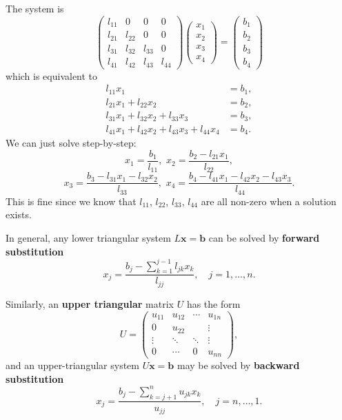 \documentclass[
  letterpaper,
  DIV=11,
  numbers=noendperiod]{scrreprt}
\newenvironment{fbxSimple}[3]{\begin{tcolorbox}[enhanced, breakable,%
attach boxed title to top*={xshift=1.4pt},
boxed title style={boxrule=0.0mm, fuzzy shadow={1pt}{-1pt}{0mm}{0.1mm}{gray}, arc=.3em, rounded corners=east, sharp corners=west}, colframe=#1-color2, colbacktitle=#1-color1, colback = white, coltitle=black,  titlerule=0mm, toprule=0pt, bottomrule=.7pt, leftrule=.3em, rightrule=.7pt, outer arc=.3em,  	left=.5em, right=.5em, bottomtitle=1mm, toptitle=1mm,title=\textbf{#2}\hspace{0.5em}{#3}]}
{\end{tcolorbox}}
\begin{document}
\label{solve-lmathbfx-mathbfb-for-n4.}
\begin{fbxSimple}{eg}{Example 3.1: }{Solve \(L\mathbf{x} = \mathbf{b}\) for \(n=4\).}
\label{solve-lmathbfx-mathbfb-for-n4.}
The system is \[
\begin{pmatrix}
l_{11} & 0 & 0 & 0\\
l_{21} & l_{22} & 0 & 0\\
l_{31} & l_{32} & l_{33} & 0\\
l_{41} & l_{42} & l_{43} & l_{44}
\end{pmatrix}
\begin{pmatrix}
x_1\\ x_2\\ x_3\\ x_4
\end{pmatrix}
=
\begin{pmatrix}
b_1\\ b_2\\ b_3\\ b_4
\end{pmatrix}
\] which is equivalent to \[
\begin{aligned}
l_{11}x_1 &= b_1,\\
l_{21}x_1 + l_{22}x_2 &= b_2,\\
l_{31}x_1 + l_{32}x_2 + l_{33}x_3 &= b_3,\\
l_{41}x_1 + l_{42}x_2 + l_{43}x_3 + l_{44}x_4 &= b_4.
\end{aligned}
\] We can just solve step-by-step: \[
x_1 = \frac{b_1}{l_{11}}, \,\, x_2 = \frac{b_2 - l_{21}x_1}{l_{22}},
\]
\[x_3 = \frac{b_3 - l_{31}x_1 - l_{32}x_2}{l_{33}}, \,\, x_4 = \frac{b_4 - l_{41}x_1 - l_{42}x_2 - l_{43}x_3}{l_{44}}.
\] This is fine since we know that \(l_{11}\), \(l_{22}\), \(l_{33}\),
\(l_{44}\) are all non-zero when a solution exists.

\end{fbxSimple}

In general, any lower triangular system \(L\mathbf{x}=\mathbf{b}\) can
be solved by \textbf{forward substitution} \[
x_j = \frac{b_j - \sum_{k=1}^{j-1}l_{jk}x_k}{l_{jj}}, \quad j=1,\ldots,n.
\]

Similarly, an \textbf{upper triangular} matrix \(U\) has the form \[
U = \begin{pmatrix}
u_{11} & u_{12} & \cdots & u_{1n}\\
0 & u_{22} & & \vdots\\
\vdots & \ddots & \ddots & \vdots\\
0 & \cdots & 0 & u_{nn}
\end{pmatrix},
\] and an upper-triangular system \(U\mathbf{x} = \mathbf{b}\) may be
solved by \textbf{backward substitution} \[
x_j = \frac{b_j - \sum_{k=j+1}^{n}u_{jk}x_k}{u_{jj}}, \quad j=n,\ldots,1.
\]
\end{document}
